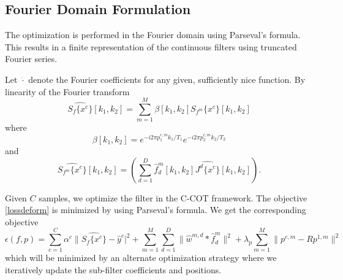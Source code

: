\documentclass[runningheads,a4paper]{llncs}
\begin{document}
\subsection{Fourier Domain Formulation}
The optimization is performed in the Fourier domain using Parseval's formula. This results in a finite representation of the continuous filters using truncated Fourier series.

Let $\hat{\cdot}$ denote the Fourier coefficients for any given, sufficiently nice function. By linearity of the Fourier transform
\begin{equation}
  \widehat{S_f\{x^c\}}[k_1,k_2] = \sum_{m=1}^M\beta[k_1,k_2]\widehat{S_{f^m}\{x^c\}}[k_1,k_2]
\end{equation}
where
\begin{equation}
  \beta[k_1,k_2] = e^{-i2\pi p_1^{c,m}k_1/T_1}e^{-i2\pi p_2^{c,m}k_2/T_2}
\end{equation}
and
\begin{equation}
\widehat{S_{f^m}\{x^c\}}[k_1,k_2] = \left(\sum_{d=1}^D\hat{f}_d^m[k_1,k_2]\widehat{J^d\{x^c\}}[k_1,k_2]\right).
\end{equation}

Given $C$ samples, we optimize the filter in the C-COT framework. The objective \ref{lossdeform} is minimized by using Parseval's formula. We get the corresponding objective
\begin{equation}
  \epsilon(f,p) = \sum_{c=1}^C\alpha^c\|\widehat{S_{f}\{x^c\}} - \hat{y}^c|^2 + \sum_{m=1}^M\sum_{d=1}^D\|\hat{w}^{m,d}*\hat{f}_d^m\|^2 + \lambda_p\sum_{m=1}^M\|p^{c,m} - Rp^{1,m}\|^2
\end{equation}
which will be minimized by an alternate optimization strategy where we iteratively update the sub-filter coefficients and positions.
\end{document}
